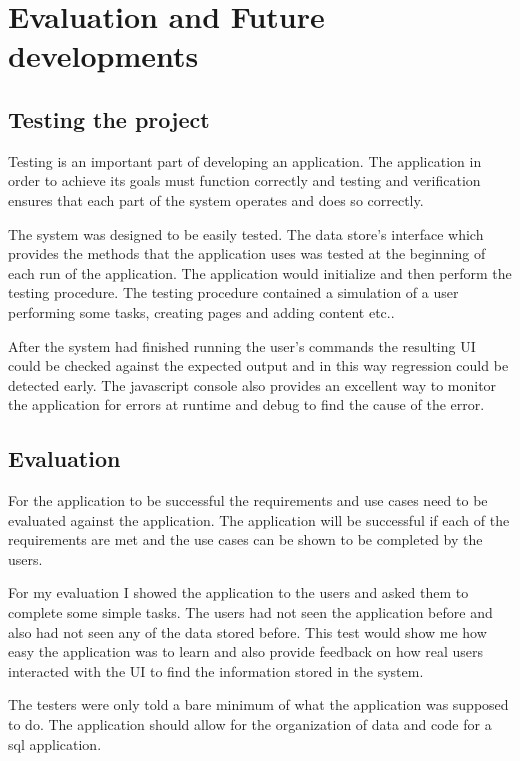 \chapter{Evaluation and Future
developments}\label{evaluation-and-future-developments}

\section{Testing the project}\label{testing-the-project}

Testing is an important part of developing an application. The
application in order to achieve its goals must function correctly and
testing and verification ensures that each part of the system operates
and does so correctly.

The system was designed to be easily tested. The data store's interface
which provides the methods that the application uses was tested at the
beginning of each run of the application. The application would
initialize and then perform the testing procedure. The testing procedure
contained a simulation of a user performing some tasks, creating pages
and adding content etc..

After the system had finished running the user's commands the resulting
UI could be checked against the expected output and in this way
regression could be detected early. The javascript console also provides
an excellent way to monitor the application for errors at runtime and
debug to find the cause of the error.

\section{Evaluation}\label{evaluation}

For the application to be successful the requirements and use cases need
to be evaluated against the application. The application will be
successful if each of the requirements are met and the use cases can be
shown to be completed by the users.

For my evaluation I showed the application to the users and asked them
to complete some simple tasks. The users had not seen the application
before and also had not seen any of the data stored before. This test
would show me how easy the application was to learn and also provide
feedback on how real users interacted with the UI to find the
information stored in the system.

The testers were only told a bare minimum of what the application was
supposed to do. The application should allow for the organization of
data and code for a sql application.

